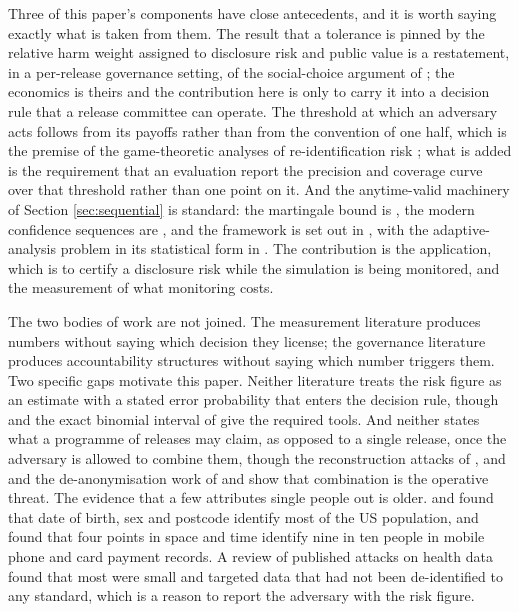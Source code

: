 \documentclass[11pt,a4paper]{article}
\theoremstyle{plain}
\theoremstyle{definition}
\begin{document}
Three of this paper's components have close antecedents, and it is worth saying
exactly what is taken from them. The result that a tolerance is pinned by the
relative harm weight assigned to disclosure risk and public value is a restatement,
in a per-release governance setting, of the social-choice argument of
\citet{abowd2019}; the economics is theirs and the contribution here is only to
carry it into a decision rule that a release committee can operate. The threshold
at which an adversary acts follows from its payoffs rather than from the
convention of one half, which is the premise of the game-theoretic analyses of
re-identification risk \citep{wan2015}; what is added is the requirement that an
evaluation report the precision and coverage curve over that threshold rather
than one point on it. And the anytime-valid machinery of Section
\ref{sec:sequential} is standard: the martingale bound is \citet{ville1939}, the
modern confidence sequences are \citet{howard2021}, and the framework is set out
in \citet{ramdas2023}, with the adaptive-analysis problem in its statistical form
in \citet{dwork2015}. The contribution is the application, which is to certify a
disclosure risk while the simulation is being monitored, and the measurement of
what monitoring costs.

The two bodies of work are not joined. The measurement literature produces
numbers without saying which decision they license; the governance literature
produces accountability structures without saying which number triggers them. Two specific gaps motivate this paper. Neither literature
treats the risk figure as an estimate with a stated error probability that
enters the decision rule, though \citet{brown2001} and the exact binomial
interval of \citet{clopper1934} give the required tools. And neither states
what a programme of releases may claim, as opposed to a single release, once the
adversary is allowed to combine them, though the reconstruction attacks of
\citet{dinur2003}, \citet{garfinkel2019} and \citet{dick2023} and the
de-anonymisation work of \citet{narayanan2008} and \citet{rocher2019} show that
combination is the operative threat. The evidence that a few attributes single
people out is older. \citet{sweeney2000} and \citet{golle2006} found that date
of birth, sex and postcode identify most of the US population, and
\citet{demontjoye2013,demontjoye2015} found that four points in space and time
identify nine in ten people in mobile phone and card payment records. A review
of published attacks on health data \citep{elemam2011} found that most were
small and targeted data that had not been de-identified to any standard, which
is a reason to report the adversary with the risk figure.
\end{document}
